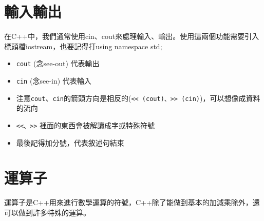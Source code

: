 \documentclass[a4paper, 11pt, oneside]{book}
\begin{document}
\section{輸入輸出}
在C++中，我們通常使用cin、cout來處理輸入、輸出。使用這兩個功能需要引入標頭檔iostream，也要記得打using namespace std;

\begin{itemize}
\item \texttt{cout} (念see-out) 代表輸出
\item \texttt{cin} (念see-in) 代表輸入
\item 注意\texttt{cout}、\texttt{cin}的箭頭方向是相反的(\texttt{<< (cout)、>> (cin)})，可以想像成資料的流向
\item \texttt{<<、>>} 裡面的東西會被解讀成字或特殊符號
\item 最後記得加分號，代表敘述句結束
\end{itemize}

\section{運算子}
運算子是C++用來進行數學運算的符號，C++除了能做到基本的加減乘除外，還可以做到許多特殊的運算。
\end{document}
